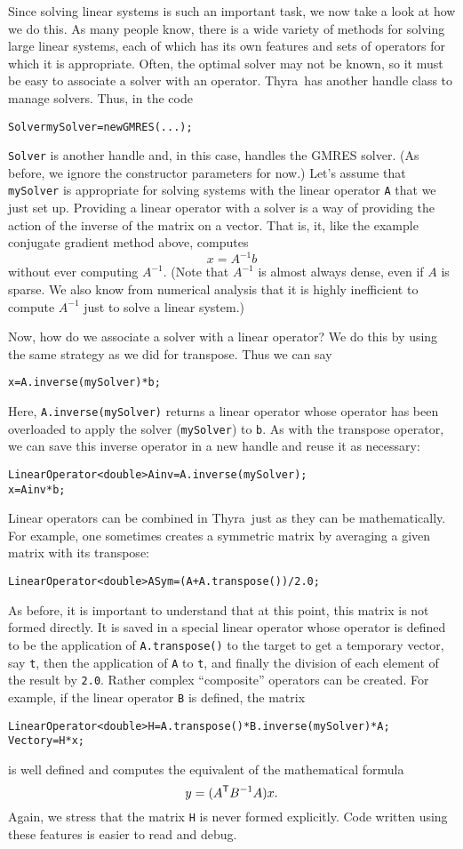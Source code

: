 \documentclass[12pt]{article}
\newcommand{\bd}{\begin{displaymath}}
\newcommand{\ed}{\end{displaymath}}
\newcommand{\trp}{^{\sf T}}
\newcommand{\inv}{^{-1}}
\newcommand{\thyra}{{\sf Thyra}}
\newcommand{\lcode}[1]{{\tt #1}}
\newenvironment{dcode}{  \begin{center} 
    \begin{minipage}{.9\textwidth}
     \begin{alltt}}
{\end{alltt}
    \end{minipage}
  \end{center}}
\newcommand{\bdcode}{\begin{dcode}}
\newcommand{\edcode}{\end{dcode}}
\begin{document}
Since solving linear systems is such an important task, we now take a
look at how we do this.  As many people know, there is a wide variety
of methods for solving large linear systems, each of which has its own
features and sets of operators for which it is appropriate.  Often,
the optimal solver may  not be known, so it must be easy to associate a
solver with an operator.  \thyra\ has another handle class to manage
solvers.  Thus, in the code
\bdcode
Solver mySolver = new GMRES(...);
\edcode
\lcode{Solver} is another handle and, in this case, handles the GMRES
solver.  (As before, we ignore the constructor parameters for now.)
Let's assume that \lcode{mySolver} is appropriate for solving systems
with the linear operator \lcode{A} that we just set up.  Providing a
linear operator with a solver is a way of providing the action of the inverse of
the matrix on a vector.  That is, it, like the example conjugate
gradient method above, computes 
\bd
    x = A \inv b
\ed
without ever computing $A \inv$.  (Note that $A\inv$ is almost always
dense, even if $A$ is sparse.  We also know from numerical analysis
that it is highly inefficient to compute $A\inv$ just to solve a
linear system.)  

Now, how do we associate a solver with a linear operator?  We do this
by using the same strategy as we did for transpose.  Thus we can say
\bdcode
x = A.inverse(mySolver) * b;
\edcode
Here, \lcode{A.inverse(mySolver)} returns a linear operator whose
\lcode{*} operator has been overloaded to apply the solver
(\lcode{mySolver}) to \lcode{b}.  As with the transpose operator, we
can save this inverse operator in a new handle and reuse it as
necessary:
\bdcode
LinearOperator<double> Ainv = A.inverse(mySolver); 
x = Ainv * b;
\edcode

Linear operators can be combined in \thyra\ just as they can be
mathematically.  For example, one sometimes creates a symmetric matrix
by averaging a given matrix with its transpose:
\bdcode
LinearOperator<double> ASym = (A + A.transpose()) / 2.0;
\edcode
As before, it is important to understand that at this point, this
matrix is not formed directly.  It is saved in a special linear
operator whose \lcode{*} operator is defined to be the application of
\lcode{A.transpose()} to the target to get a temporary vector, say
\lcode{t}, then the application of \lcode{A} to \lcode{t}, and finally
the division of each element of the result by \lcode{2.0}.
Rather complex ``composite'' operators can be created.  For example,
if the linear operator \lcode{B} is defined, the matrix
\bdcode
LinearOperator<double> H = A.transpose() * B.inverse(mySolver)* A; 
Vector y = H * x;
\edcode
is well defined and computes the equivalent of the mathematical
formula
\bd
     y = (A\trp B\inv A) x.
\ed
Again, we stress that the matrix \lcode{H} is never formed
explicitly.  Code written using these features is easier to read and
debug. 
\end{document}
